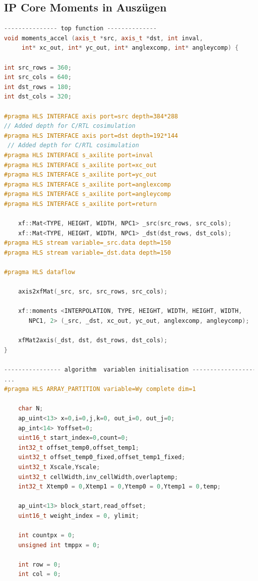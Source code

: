 \documentclass[a4paper]{report}
\begin{document}
\subsection{IP Core Moments in Auszügen}

\begin{lstlisting}[language=C++, caption=IP Core]
--------------- top function --------------
void moments_accel (axis_t *src, axis_t *dst, int inval,
	 int* xc_out, int* yc_out, int* anglexcomp, int* angleycomp) {
	
int src_rows = 360;
int src_cols = 640;
int dst_rows = 180;
int dst_cols = 320;

#pragma HLS INTERFACE axis port=src depth=384*288 
// Added depth for C/RTL cosimulation
#pragma HLS INTERFACE axis port=dst depth=192*144
 // Added depth for C/RTL cosimulation
#pragma HLS INTERFACE s_axilite port=inval
#pragma HLS INTERFACE s_axilite port=xc_out
#pragma HLS INTERFACE s_axilite port=yc_out
#pragma HLS INTERFACE s_axilite port=anglexcomp
#pragma HLS INTERFACE s_axilite port=angleycomp
#pragma HLS INTERFACE s_axilite port=return

	xf::Mat<TYPE, HEIGHT, WIDTH, NPC1> _src(src_rows, src_cols);
	xf::Mat<TYPE, HEIGHT, WIDTH, NPC1> _dst(dst_rows, dst_cols);
#pragma HLS stream variable=_src.data depth=150
#pragma HLS stream variable=_dst.data depth=150

#pragma HLS dataflow
	
	axis2xfMat(_src, src, src_rows, src_cols);	

	xf::moments <INTERPOLATION, TYPE, HEIGHT, WIDTH, HEIGHT, WIDTH, 
	   NPC1, 2> (_src, _dst, xc_out, yc_out, anglexcomp, angleycomp);

	xfMat2axis(_dst, dst, dst_rows, dst_cols);	
}

---------------- algorithm  variablen initialisation ------------------
...
#pragma HLS ARRAY_PARTITION variable=Wy complete dim=1

	char N;
	ap_uint<13> x=0,i=0,j,k=0, out_i=0, out_j=0;
	ap_int<14> Yoffset=0;
	uint16_t start_index=0,count=0;
	int32_t offset_temp0,offset_temp1;
	uint32_t offset_temp0_fixed,offset_temp1_fixed;
	uint32_t Xscale,Yscale;
	uint32_t cellWidth,inv_cellWidth,overlaptemp;
	int32_t Xtemp0 = 0,Xtemp1 = 0,Ytemp0 = 0,Ytemp1 = 0,temp;

	ap_uint<13> block_start,read_offset;
	uint16_t weight_index = 0, ylimit;

	int countpx = 0;
	unsigned int tmppx = 0;
	
	int row = 0;
	int col = 0;


\end{lstlisting}
\end{document}
